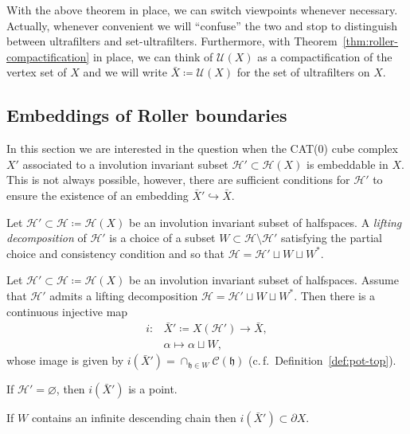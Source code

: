 With the above theorem in place, we can switch viewpoints whenever necessary. Actually, whenever convenient we will \enquote{confuse} the two and stop to distinguish between ultrafilters and set-ultrafilters. Furthermore, with Theorem~\ref{thm:roller-compactification} in place, we can think of \(\mathcal{U}(X)\) as a compactification of the vertex set of \(X\) and we will write \(\bar X \coloneqq \mathcal{U}(X)\) for the set of ultrafilters on \(X\).

\subsection{Embeddings of Roller boundaries}
\label{sec:embedding-roller}

In this section we are interested in the question when the CAT(0) cube complex \(X'\) associated to a involution invariant subset \(\mathcal{H}' \subset \mathcal{H}(X)\) is embeddable in \(X\). This is not always possible, however, there are sufficient conditions for \(\mathcal{H}'\) to ensure the existence of an embedding \(\bar X' \hookrightarrow \bar X\).

\begin{defin}
  Let \(\mathcal{H}' \subset \mathcal{H} \coloneqq \mathcal{H}(X)\) be an involution invariant subset of halfspaces. A \emph{lifting decomposition} of \(\mathcal{H}'\) is a choice of a subset \(W \subset \mathcal{H} \setminus \mathcal{H}'\) satisfying the partial choice and consistency condition and so that \(\mathcal{H} = \mathcal{H}' \sqcup W \sqcup W^\ast\).
\end{defin}

\begin{lemma}[{\cite[Lemma~2.6]{MR3509968}}]
  Let \(\mathcal{H}' \subset \mathcal{H} \coloneqq \mathcal{H}(X)\) be an involution invariant subset of halfspaces. Assume that \(\mathcal{H}'\) admits a lifting decomposition \(\mathcal{H} = \mathcal{H}' \sqcup W \sqcup W^\ast\). Then there is a continuous injective map
  \begin{align*}
    i\colon &\bar X' \coloneqq X(\mathcal{H}') \to \bar X,\\
            &\alpha \mapsto \alpha \sqcup W,
  \end{align*}
  whose image is given by \(i(\bar X') = \cap_{\mathfrak{h} \in W} \mathcal{C}(\mathfrak{h})\) (c.\,f.\ Definition~\ref{def:pot-top}).

  If \(\mathcal{H}' = \varnothing\), then \(i(\bar X')\) is a point.

  If \(W\) contains an infinite descending chain then \(i(\bar X') \subset \partial X\).
\end{lemma}

